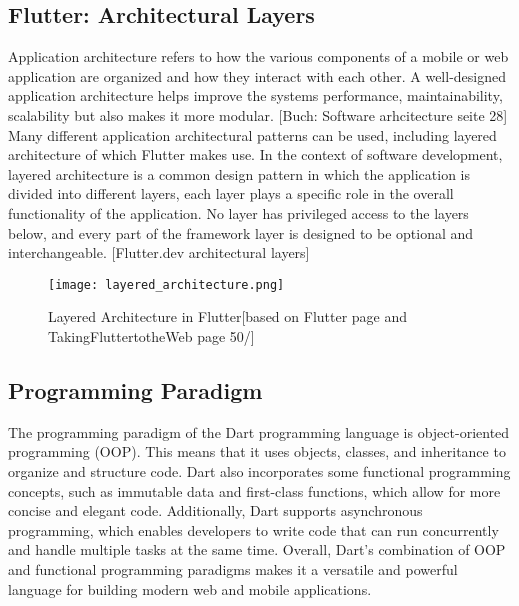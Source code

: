 \subsection{Flutter: Architectural Layers}
Application architecture refers to how the various components of a mobile or web application are organized and how they interact with each other. A well-designed application architecture helps improve the systems performance, maintainability, scalability but also makes it more modular. [Buch: Software arhcitecture seite 28] Many different application architectural patterns can be used, including layered architecture of which Flutter makes use.  In the context of software development, layered architecture is a common design pattern in which the application is divided into different layers, each layer plays a specific role in the overall functionality of the application. No layer has privileged access to the layers below, and every part of the framework layer is designed to be optional and interchangeable. [Flutter.dev architectural layers] 
\begin{figure}[H]
	\centering
	\texttt{[image: layered\_architecture.png]}
	\caption[Layered Architecture in Flutter]{Layered Architecture in Flutter[based on Flutter page and TakingFluttertotheWeb page 50/]}
\end{figure}

\subsection{Programming Paradigm}
The programming paradigm of the Dart programming language is object-oriented programming (OOP). This means that it uses objects, classes, and inheritance to organize and structure code. Dart also incorporates some functional programming concepts, such as immutable data and first-class functions, which allow for more concise and elegant code. Additionally, Dart supports asynchronous programming, which enables developers to write code that can run concurrently and handle multiple tasks at the same time. Overall, Dart's combination of OOP and functional programming paradigms makes it a versatile and powerful language for building modern web and mobile applications.

